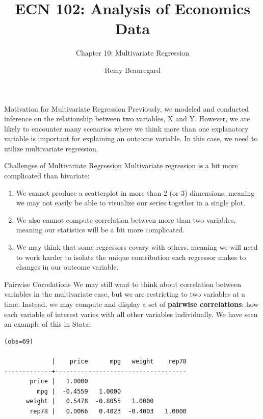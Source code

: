 \documentclass[
  ignorenonframetext,
  english,
]{beamer}
\title{\texorpdfstring{ECN 102: Analysis of Economics
Data}{ECN 102: Analysis of Economics Data}}
\subtitle{\texorpdfstring{Chapter 10: Multivariate
Regression}{Chapter 10: Multivariate Regression}}
\author{Remy Beauregard}
\date{}
\begin{document}
\frame{\titlepage}


\begin{frame}{Motivation for Multivariate Regression}
\protect{}\label{motivation-for-multivariate-regression}
Previously, we modeled and conducted inference on the relationship
between two variables, X and Y. However, we are likely to encounter many
scenarios where we think more than one explanatory variable is important
for explaining an outcome variable. In this case, we need to utilize
multivariate regression.
\end{frame}

\begin{frame}{Challenges of Multivariate Regression}
\protect{}\label{challenges-of-multivariate-regression}
Multivariate regression is a bit more complicated than bivariate:

\begin{enumerate}
[1)]
\item
  We cannot produce a scatterplot in more than 2 (or 3) dimensions,
  meaning we may not easily be able to visualize our series together in
  a single plot.
\item
  We also cannot compute correlation between more than two variables,
  meaning our statistics will be a bit more complicated.
\item
  We may think that some regressors covary with others, meaning we will
  need to work harder to isolate the unique contribution each regressor
  makes to changes in our outcome variable.
\end{enumerate}
\end{frame}

\begin{frame}[fragile]{Pairwise Correlations}
\protect{}\label{pairwise-correlations}
We may still want to think about correlation between variables in the
multivariate case, but we are restricting to two variables at a time.
Instead, we may compute and display a set of \textbf{pairwise
correlations}: how each variable of interest varies with all other
variables individually. We have seen an example of this in Stata:

\begin{verbatim}
(obs=69)

             |    price      mpg   weight    rep78
-------------+------------------------------------
       price |   1.0000
         mpg |  -0.4559   1.0000
      weight |   0.5478  -0.8055   1.0000
       rep78 |   0.0066   0.4023  -0.4003   1.0000
\end{verbatim}
\end{frame}
\end{document}

